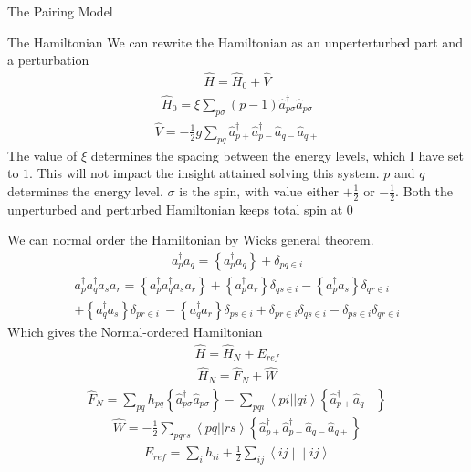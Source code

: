\documentclass[twoside,english]{uiofysmaster}
\begin{document}
\begin{chapter}{The Pairing Model}
\begin{section}{The Hamiltonian}
		We can rewrite the Hamiltonian as an unperterturbed part and a perturbation
		\begin{align}
			\hat H = \hat H_0 + \hat V
		\end{align}
		\begin{align}
			\hat H_0 = \xi \sum_{p \sigma} (p-1) \hat a_{p \sigma}^{\dagger} \hat a_{p \sigma}
		\end{align}
		\begin{align}
			\hat V = - \frac{1}{2}g \sum_{pq} \hat a_{p +}^{\dagger} \hat a_{p-}^{\dagger} \hat a_{q-} \hat a_{q+}
		\end{align}
		The value of $\xi$ determines the spacing between the energy levels, which I have set to $1$. This will not impact the insight attained solving this system. $p$ and $q$ determines the energy level. $\sigma$ is the spin, with value either $+\frac{1}{2}$ or $-\frac{1}{2}$. Both the unperturbed and perturbed Hamiltonian keeps total spin at $0$

		We can normal order the Hamiltonian by Wicks general theorem. 
		\begin{align}
			a_p^{\dagger} a_q = \left\{ a_p^{\dagger}a_q \right\} + \delta_{pq \in i}
		\end{align}
		\begin{align}
			a_p^{\dagger} a_q^{\dagger} a_s a_r = \left\{ a_p^{\dagger}a_q^{\dagger} a_s a_r \right\} +\left\{a_p^{\dagger}a_r\right\} \delta_{qs\in i} - \left\{a_p^{\dagger}a_s\right\} \delta_{qr\in i} \\
			+\left\{a_q^{\dagger}a_s\right\} \delta_{pr\in i} \
			- \left\{a_q^{\dagger}a_r\right\} \delta_{ps\in i} + \delta_{pr \in i} \delta_{qs \in i} - \delta_{ps \in i}\delta_{qr \in i}
		\end{align}
		Which gives the Normal-ordered Hamiltonian
		\begin{align}
			\hat H = \hat H_N + E_{ref}
		\end{align}
		\begin{align}
			\hat H_N = \hat F_N + \hat W 
		\end{align}
		\begin{align}
			\hat F_N =  \sum_{pq} h_{pq} \left\{ \hat a_{p \sigma}^{\dagger} \hat a_{p \sigma} \right\}
			- \sum_{pqi} \left< pi || qi \right> \left\{ \hat a_{p +}^{\dagger} \hat a_{q -} \right\}
		\end{align}
		\begin{align}
			\hat W = - \frac{1}{2} \sum_{pqrs} \left< pq || rs \right> \left\{ \hat a_{p +}^{\dagger} \hat a_{p-}^{\dagger} \hat a_{q-} \hat a_{q+} \right\}
		\end{align}
		\begin{align}
 			E_{ref} = \sum_{i} h_{ii} + \frac{1}{2} \sum_{ij} \left< ij \middle| \middle| ij \right>
		\end{align}


\end{section}
\end{chapter}
\end{document}
